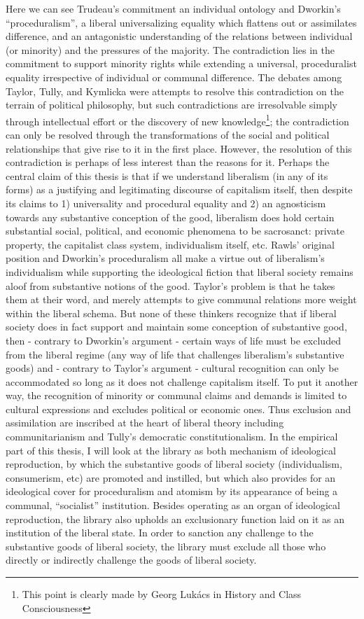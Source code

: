 \documentclass[12pt,oneside]{memoir}
\begin{document}
Here we can see Trudeau's commitment an individual ontology and Dworkin's ``proceduralism'', a liberal universalizing equality which flattens out or assimilates difference, and an antagonistic understanding of the relations between individual (or minority) and the pressures of the majority. The contradiction lies in the commitment to support minority rights while extending a universal, proceduralist equality irrespective of individual or communal difference. The debates among Taylor, Tully, and Kymlicka were attempts to resolve this contradiction on the terrain of political philosophy, but such contradictions are irresolvable simply through intellectual effort or the discovery of new knowledge\footnote{This point is clearly made by Georg Lukács in History and Class Consciousness}; the contradiction can only be resolved through the transformations of the social and political relationships that give rise to it in the first place. 
However, the resolution of this contradiction is perhaps of less interest than the reasons for it. Perhaps the central claim of this thesis is that if we understand liberalism (in any of its forms) as a justifying and legitimating discourse of capitalism itself, then despite its claims to 1) universality and procedural equality and 2) an agnosticism towards any substantive conception of the good, liberalism does hold certain substantial social, political, and economic phenomena to be sacrosanct: private property, the capitalist class system, individualism itself, etc. Rawls' original position and Dworkin's proceduralism all make a virtue out of liberalism's individualism while supporting the ideological fiction that liberal society remains aloof from substantive notions of the good. Taylor's problem is that he takes them at their word, and merely attempts to give communal relations more weight within the liberal schema. But none of these thinkers recognize that if liberal society does in fact support and maintain some conception of substantive good, then - contrary to Dworkin's argument - certain ways of life must be excluded from the liberal regime (any way of life that challenges liberalism's substantive goods) and - contrary to Taylor's argument - cultural recognition can only be accommodated so long as it does not challenge capitalism itself. To put it another way, the recognition of minority or communal claims and demands is limited to cultural expressions and excludes political or economic ones.
Thus exclusion and assimilation are inscribed at the heart of liberal theory including communitarianism and Tully's democratic constitutionalism. In the empirical part of this thesis, I will look at the library as both mechanism of ideological reproduction, by which the substantive goods of liberal society (individualism, consumerism, etc) are promoted and instilled, but which also provides for an ideological cover for proceduralism and atomism by its appearance of being a communal, ``socialist'' institution. Besides operating as an organ of ideological reproduction, the library also upholds an exclusionary function laid on it as an institution of the liberal state. In order to sanction any challenge to the substantive goods of liberal society, the library must exclude all those who directly or indirectly challenge the goods of liberal society. 
\end{document}

